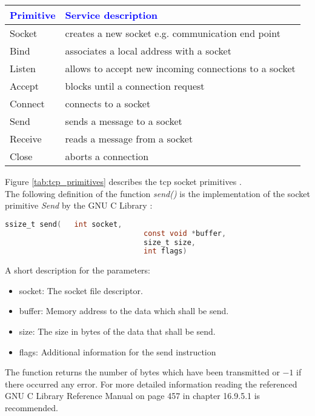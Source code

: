 \documentclass[xcolor=dvipsnames]{article}
\begin{document}
\begin{center}
\begin{tabular}{ | l | l | } 
\hline
\textcolor{blue}{Primitive} & \textcolor{blue}{Service description}\\
\hline
Socket & creates a new socket e.g. communication end point\\
Bind & associates a local address with a socket\\
Listen & allows to accept new incoming connections to a socket\\
Accept & blocks until a connection request\\
Connect & connects to a socket\\
Send & sends a message to a socket\\
Receive & reads a message from a socket\\
Close & aborts a connection\\
\hline
\end{tabular}
\end{center}
\label{tab:tcp_primitives}

Figure \ref{tab:tcp_primitives} describes the \gls{tcp} socket primitives \cite[p. 142, ch. 4.3.1]{tanenbaum}.\\

\noindent The following definition of the function \textit{send()} is the implementation of the socket primitive \textit{Send} by the GNU C Library \cite[p. 457, ch. 16.9.5.1]{GNU_C_library_manual}:

\begin{lstlisting}[language=C, numbers=none]
ssize_t send(  	int socket, 
								const void *buffer, 
								size_t size, 
								int flags)
\end{lstlisting}

\noindent A short description for the parameters:

\begin{itemize}
\item socket: The socket file descriptor.
\item buffer: Memory address to the data which shall be send.
\item size: The size in bytes of the data that shall be send.
\item flags: Additional information for the send instruction \cite[p. 459, ch. 16.9.5.3]{GNU_C_library_manual}
\end{itemize}

\noindent The function returns the number of bytes which have been transmitted or $-1$ if there occurred any error. For more detailed information reading the referenced GNU C Library Reference Manual \cite{GNU_C_library_manual} on page 457 in chapter 16.9.5.1 is recommended.\\
\end{document}
